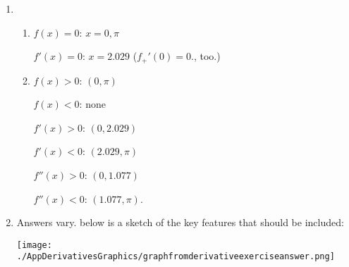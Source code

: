 \documentclass{ximera}
\begin{document}
\begin{enumerate}
\begin{enumerate}
\smallskip



\end{enumerate}

\newpage

\item \begin{enumerate}  \item

\begin{multicols}{2}

 $f(x) = 0$:  $x = 0, \pi$
 
  $f'(x) = 0$: $x = 2.029$ ($f_{+}'(0) = 0$.,  too.)

\end{multicols}

\smallskip

\item  \begin{multicols}{2}

 $f(x) > 0$: $(0, \pi)$
 
  $f(x) < 0$: none

\end{multicols}

\smallskip

\begin{multicols}{2}

 $f'(x) > 0$: $(0, 2.029)$
 
  $f'(x) < 0$: $(2.029, \pi)$

\end{multicols}

\smallskip

\begin{multicols}{2}

 $f''(x) > 0$: $(0, 1.077)$
 
  $f''(x) < 0$: $(1.077, \pi)$.

\end{multicols}

\end{enumerate}

\item Answers vary.  below is a sketch of the key features that should be included:


\begin{center}

\centerline{\texttt{[image: ./AppDerivativesGraphics/graphfromderivativeexerciseanswer.png]}}
\end{center}


\setcounter{HW}{\value{enumi}}
\end{enumerate}
\end{document}
